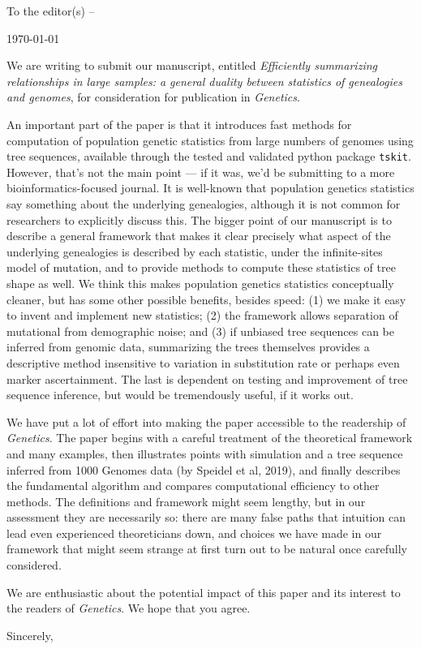 \documentclass[12pt,letterpaper]{article}
\begin{document}
\pagestyle{plain}

\noindent 
  

\opening{To the editor(s) --}
\today

    We are writing to submit our manuscript, entitled
    \emph{Efficiently summarizing relationships in large samples: a general
        duality between statistics of genealogies and genomes},
    for consideration for publication in \textit{Genetics}.

    An important part of the paper is that it introduces fast methods for computation
    of population genetic statistics from large numbers of genomes using tree sequences,
    available through the tested and validated python package \texttt{tskit}.
    However, that's not the main point ---
    if it was, we'd be submitting to a more bioinformatics-focused journal. 
    It is well-known that population genetics statistics say something about the underlying genealogies,
    although it is not common for researchers to explicitly discuss this.
    The bigger point of our manuscript is to describe a general framework that makes it clear
    precisely what aspect of the underlying genealogies is described by each statistic,
    under the infinite-sites model of mutation,
    and to provide methods to compute these statistics of tree shape as well.
    We think this makes population genetics statistics conceptually cleaner,
    but has some other possible benefits, besides speed:
    (1) we make it easy to invent and implement new statistics;
    (2) the framework allows separation of mutational from demographic noise;
    and (3) if unbiased tree sequences can be inferred from genomic data,
    summarizing the trees themselves provides a descriptive method
    insensitive to variation in substitution rate or perhaps even marker ascertainment.
    The last is dependent on testing and improvement of tree sequence inference,
    but would be tremendously useful, if it works out.

    We have put a lot of effort into making the paper accessible to the readership of \textit{Genetics}.
    The paper begins with a careful treatment of the theoretical framework and many examples,
    then illustrates points with simulation and a tree sequence inferred from 1000 Genomes data
    (by Speidel et al, 2019),
    and finally describes the fundamental algorithm and compares computational efficiency
    to other methods.
    The definitions and framework might seem lengthy,
    but in our assessment they are necessarily so:
    there are many false paths that intuition can lead even experienced theoreticians down,
    and choices we have made in our framework that might seem strange at first
    turn out to be natural once carefully considered.

    We are enthusiastic about the potential impact of this paper
    and its interest to the readers of \textit{Genetics}.
    We hope that you agree.

\closing{Sincerely,}
\end{document}

